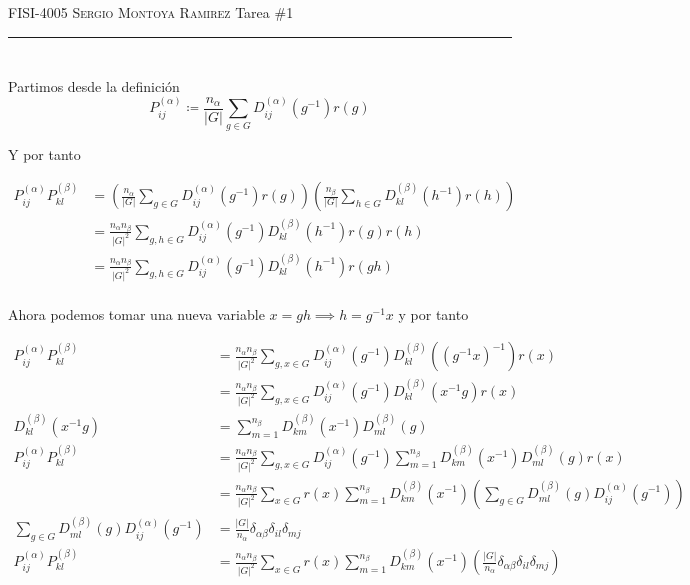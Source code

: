 \documentclass[12pt]{amsart}
\begin{document}
  \thispagestyle{empty}

  {\scshape FISI-4005} \hfill {\scshape \large Sergio Montoya Ramirez} \hfill {Tarea \#1\scshape }

  \smallskip

  \hrule

  \section{}

  Partimos desde la definición
  $$P_{ij}^{(\alpha)} \coloneq \frac{n_\alpha}{\left|G\right|} \sum_{g \in G} D_{ij}^{(\alpha)}(g^{-1})r(g)$$

  Y por tanto

  \begin{align*}
    P_{ij}^{(\alpha)} P_{kl}^{(\beta)} &= \left(\frac{n_\alpha}{\left|G\right|} \sum_{g \in G} D_{ij}^{(\alpha)}(g^{-1})r(g)\right)\left(\frac{n_\beta}{\left|G\right|} \sum_{h \in G} D_{kl}^{(\beta)}(h^{-1})r(h)\right)\\
    &= \frac{n_\alpha n_\beta}{\left|G\right|^2} \sum_{g, h \in G} D_{ij}^{(\alpha)}(g^{-1}) D_{kl}^{(\beta)}(h^{-1})r(g)r(h)\\
    &= \frac{n_\alpha n_\beta}{\left|G\right|^2} \sum_{g, h \in G} D_{ij}^{(\alpha)}(g^{-1}) D_{kl}^{(\beta)}(h^{-1})r(gh)\\
  \end{align*}

  Ahora podemos tomar una nueva variable $x = gh \implies h = g^{-1} x$ y por tanto

  \begin{align*}
    P_{ij}^{(\alpha)} P_{kl}^{(\beta)} &= \frac{n_\alpha n_\beta}{\left|G\right|^2} \sum_{g, x \in G} D_{ij}^{(\alpha)}(g^{-1}) D_{kl}^{(\beta)}((g^{-1} x)^{-1})r(x)\\
    &= \frac{n_\alpha n_\beta}{\left|G\right|^2} \sum_{g, x \in G} D_{ij}^{(\alpha)}(g^{-1}) D_{kl}^{(\beta)}(x^{-1}g)r(x)\\
    D_{kl}^{(\beta)} (x^{-1}g) &= \sum_{m = 1}^{n_\beta} D_{km}^{(\beta)}(x^{-1})D_{ml}^{(\beta)}(g)\\
    P_{ij}^{(\alpha)} P_{kl}^{(\beta)} &= \frac{n_\alpha n_\beta}{\left|G\right|^2} \sum_{g, x \in G} D_{ij}^{(\alpha)}(g^{-1}) \sum_{m = 1}^{n_\beta} D_{km}^{(\beta)}(x^{-1})D_{ml}^{(\beta)}(g) r(x)\\
    &= \frac{n_\alpha n_\beta}{\left|G\right|^2} \sum_{x \in G} r(x) \sum_{m = 1}^{n_\beta} D_{km}^{(\beta)}(x^{-1}) \left(\sum_{g \in G} D_{ml}^{(\beta)}(g) D_{ij}^{(\alpha)}(g^{-1}) \right)\\
    \sum_{g \in G} D_{ml}^{(\beta)}(g) D_{ij}^{(\alpha)}(g^{-1})  &= \frac{\left|G\right|}{n_\alpha} \delta_{\alpha\beta} \delta_{il}\delta_{mj}\\
    P_{ij}^{(\alpha)} P_{kl}^{(\beta)}&= \frac{n_\alpha n_\beta}{\left|G\right|^2} \sum_{x \in G} r(x) \sum_{m = 1}^{n_\beta} D_{km}^{(\beta)}(x^{-1}) \left(\frac{\left|G\right|}{n_\alpha} \delta_{\alpha\beta} \delta_{il}\delta_{mj}\right)\\
  \end{align*}
\end{document}
